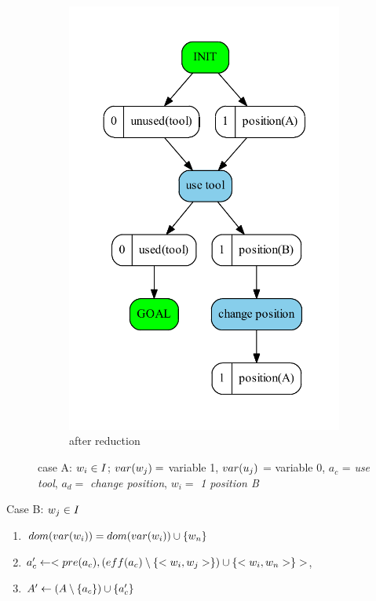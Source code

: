 \begin{figure}
\begin{subfigure}[b]{0.4\textwidth}
			\includegraphics[scale=0.4]{oneUsage/figures/startsInInit_output}
			\caption{after reduction}
		\end{subfigure}
		\caption{case A: $w_i \in I$; $var(w_j) = $ variable 1, $var(u_j)$ = variable 0, $a_c$ = \emph{use tool}, $a_d = $ \emph{change position}, $w_i = $ \emph{1 position B}}
	\end{figure}
	
	
	Case B: $w_j \in I$
	
	\begin{enumerate}
		\item $dom(var(w_i)) = dom(var(w_i)) \cup \{w_n\}$
		\item $a_c' \leftarrow <pre(a_c),(eff(a_c) \setminus \{<w_i,w_j>\}) \cup \{<w_i,w_n>\}>$, 
		\item $A{}' \leftarrow (A \setminus \{a_c\}) \cup \{a_c'\}$ 
	\end{enumerate}		
	
